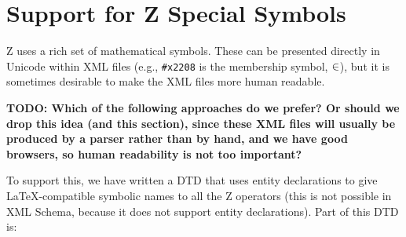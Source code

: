 \documentclass{llncs}  %
\newcommand{\TODO}[1]{\textbf{TODO: #1}}   %
\begin{document}




\section{Support for Z Special Symbols}

Z uses a rich set of mathematical symbols.  These
can be presented directly in Unicode within XML files (e.g., \verb!#x2208!
is the membership symbol, $\in$), but it is sometimes desirable to make
the XML files more human readable.  

\TODO{Which of the following approaches do we prefer?  Or should we drop
  this idea (and this section), since these XML files will usually be
  produced by a parser rather than by hand, and we have good browsers, so 
  human readability is not too important?}

To support this, we have written a DTD
that uses entity declarations to give \LaTeX-compatible symbolic names to
all the Z operators (this is not possible in XML Schema, because it does
not support entity declarations).  Part of this DTD is:
\end{document}
